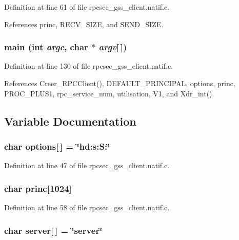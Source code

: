 Definition at line 61 of file rpcsec\_\-gss\_\-client.natif.c.

References princ, RECV\_\-SIZE, and SEND\_\-SIZE.
\subsubsection{\setlength{\rightskip}{0pt plus 5cm}main (int {\em argc}, char $\ast$ {\em argv}[$\,$])}\label{rpcsec__gss__client_8natif_8c_a15}




Definition at line 130 of file rpcsec\_\-gss\_\-client.natif.c.

References Creer\_\-RPCClient(), DEFAULT\_\-PRINCIPAL, options, princ, PROC\_\-PLUS1, rpc\_\-service\_\-num, utilisation, V1, and Xdr\_\-int().

\subsection{Variable Documentation}
\subsubsection{\setlength{\rightskip}{0pt plus 5cm}char {\bf options}[$\,$] = \char`\"{}hd:s:S:\char`\"{}}\label{rpcsec__gss__client_8natif_8c_a10}




Definition at line 47 of file rpcsec\_\-gss\_\-client.natif.c.
\subsubsection{\setlength{\rightskip}{0pt plus 5cm}char {\bf princ}[1024]}\label{rpcsec__gss__client_8natif_8c_a12}




Definition at line 58 of file rpcsec\_\-gss\_\-client.natif.c.
\subsubsection{\setlength{\rightskip}{0pt plus 5cm}char {\bf server}[$\,$] = \char`\"{}server\char`\"{}}\label{rpcsec__gss__client_8natif_8c_a13}




